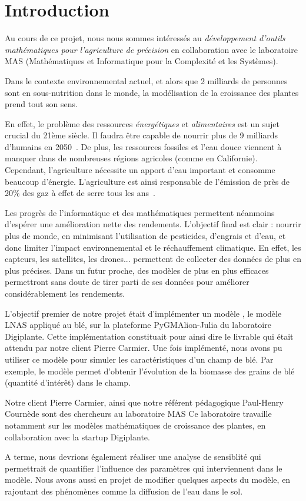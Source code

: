 \section{Introduction}


Au cours de ce projet, nous nous sommes intéressés au \emph{développement d'outils mathématiques 
pour l'agriculture de précision} en collaboration avec le laboratoire MAS (Mathématiques et Informatique pour la Complexité et les Systèmes).

Dans le contexte environnemental actuel, et alors que 2 milliards de personnes sont en sous-nutrition dans le monde, la modélisation de la croissance des plantes prend tout son sens.

En effet, le problème des ressources \textit{énergétiques} et \textit{alimentaires} est un sujet crucial du  21ème siècle.
Il faudra être capable de nourrir plus de 
9 milliards d'humains en 2050~\cite{wiki:popu_mondiale}.
De plus, les ressources fossiles et l'eau douce viennent à manquer dans de nombreuses régions agricoles (comme en Californie). Cependant, l'agriculture nécessite un apport d'eau important et consomme beaucoup d'énergie. L'agriculture est ainsi responsable de l'émission de près de 20\% des gaz à effet de serre tous les ans~\cite{GES}.

Les progrès de l'informatique et des mathématiques permettent néanmoins d'espérer une amélioration nette des rendements. L'objectif final est clair : nourrir plus de monde, en minimisant l'utilisation de pesticides, d'engrais et d'eau, et donc limiter l'impact environnemental et le réchauffement climatique. En effet, les capteurs, les satellites, les drones... permettent de collecter des données de plus en plus précises. Dans un futur proche, des modèles de plus en plus efficaces permettront sans doute de tirer parti de ses données pour améliorer considérablement les rendements.  

L'objectif premier de notre projet était d'implémenter un modèle , le modèle LNAS appliqué au blé, sur la plateforme PyGMAlion-Julia du laboratoire Digiplante. Cette implémentation constituait pour ainsi dire le livrable qui était attendu par notre client Pierre Carmier.
Une fois implémenté, nous avons pu utiliser ce modèle pour simuler les caractéristiques d'un champ de blé. Par exemple, le modèle permet d'obtenir l'évolution de la biomasse des grains de blé (quantité d'intérêt) dans le champ.

Notre client Pierre Carmier, ainsi que notre référent pédagogique Paul-Henry Cournède sont des chercheurs au laboratoire MAS
Ce laboratoire travaille notamment sur les modèles mathématiques de
croissance des plantes, en collaboration avec la startup Digiplante.

A terme, nous devrions également réaliser une analyse de sensiblité qui permettrait de quantifier l'influence des paramètres qui interviennent dans le modèle. Nous avons aussi en projet de modifier quelques aspects du modèle, en rajoutant des phénomènes comme la diffusion de l'eau dans le sol.